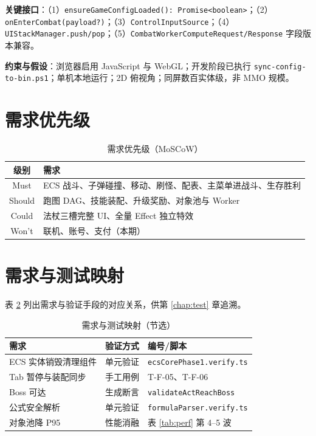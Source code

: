 \documentclass[UTF8,a4paper]{ctexart}
\begin{document}
\textbf{关键接口}：（1）\texttt{ensureGameConfigLoaded(): Promise<boolean>}；（2）\texttt{onEnterCombat(payload?)}；（3）\texttt{ControlInputSource}；（4）\texttt{UIStackManager.push/pop}；（5）\texttt{CombatWorkerComputeRequest/Response} 字段版本兼容。

\textbf{约束与假设}：浏览器启用 JavaScript 与 WebGL；开发阶段已执行 \texttt{sync-config-to-bin.ps1}；单机本地运行；2D 俯视角；同屏数百实体级，非 MMO 规模。

\section{需求优先级}

\begin{table}[htbp]
  
  \caption{需求优先级（MoSCoW）}
  \label{tab:moscow}
  \begin{tabular}{cl}
    \toprule
    \textbf{级别} & \textbf{需求} \\
    \midrule
    Must & ECS 战斗、子弹碰撞、移动、刷怪、配表、主菜单进战斗、生存胜利 \\
    Should & 跑图 DAG、技能装配、升级奖励、对象池与 Worker \\
    Could & 法杖三槽完整 UI、全量 Effect 独立特效 \\
    Won't & 联机、账号、支付（本期） \\
    \bottomrule
  \end{tabular}
\end{table}

\section{需求与测试映射}

表 \ref{tab:req-test-map} 列出需求与验证手段的对应关系，供第 \ref{chap:test} 章追溯\cite{petty2010vv}。

\begin{table}[htbp]
  
  \caption{需求与测试映射（节选）}
  \label{tab:req-test-map}
  \begin{tabular}{p{2.8cm}p{5.5cm}p{4.7cm}}
    \toprule
    \textbf{需求} & \textbf{验证方式} & \textbf{编号/脚本} \\
    \midrule
    ECS 实体销毁清理组件 & 单元验证 & \texttt{ecsCorePhase1.verify.ts} \\
    Tab 暂停与装配同步 & 手工用例 & T-F-05、T-F-06 \\
    Boss 可达 & 生成断言 & \texttt{validateActReachBoss} \\
    公式安全解析 & 单元验证 & \texttt{formulaParser.verify.ts} \\
    对象池降 P95 & 性能消融 & 表 \ref{tab:perf} 第 4--5 波 \\
    \bottomrule
  \end{tabular}
\end{table}
\end{document}
